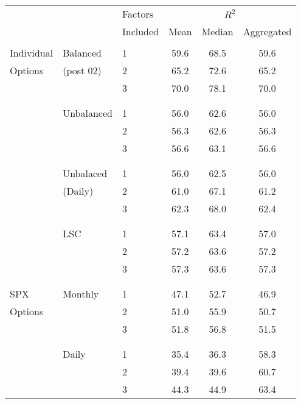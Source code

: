 \begin{tabular}{lllccc}
\toprule 
 &  & Factors & \multicolumn{3}{c}{$R^2$} \\ 
\cline{4-6} 
  & & Included & Mean & Median & Aggregated \\ 
\hline \\[-1.8ex] 
Individual & Balanced & 1 & 59.6 & 68.5 & 59.6 \\
Options & (post 02) & 2 & 65.2 & 72.6 & 65.2 \\
 &  & 3 & 70.0 & 78.1 & 70.0 \\ \\[-1.8ex]
\cline{2-6} \\[-1.8ex] 
 & Unbalanced & 1 & 56.0 & 62.6 & 56.0 \\
 &  & 2 & 56.3 & 62.6 & 56.3 \\
 &  & 3 & 56.6 & 63.1 & 56.6 \\ \\[-1.8ex]
\cline{2-6} \\[-1.8ex] 
 & Unbalaced & 1 & 56.0 & 62.5 & 56.0 \\
 & (Daily) & 2 & 61.0 & 67.1 & 61.2 \\
 &  & 3 & 62.3 & 68.0 & 62.4 \\ \\[-1.8ex]
\cline{2-6} \\[-1.8ex] 
 & LSC & 1 & 57.1 & 63.4 & 57.0 \\
 &  & 2 & 57.2 & 63.6 & 57.2 \\
 &  & 3 & 57.3 & 63.6 & 57.3 \\ \\[-1.8ex]
\hline \\[-1.8ex] 
SPX & Monthly & 1 & 47.1 & 52.7 & 46.9 \\
Options &  & 2 & 51.0 & 55.9 & 50.7 \\
 &  & 3 & 51.8 & 56.8 & 51.5 \\ \\[-1.8ex]
\cline{2-6} \\[-1.8ex] 
 & Daily & 1 & 35.4 & 36.3 & 58.3 \\
 &  & 2 & 39.4 & 39.6 & 60.7 \\
 &  & 3 & 44.3 & 44.9 & 63.4 \\
\bottomrule 
\end{tabular} 
